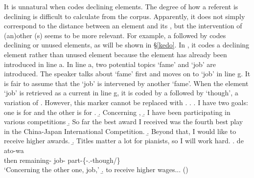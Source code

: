 It is unnatural when  codes declining elements.
The degree of how a referent is declining is difficult to calculate from the corpus.
Apparently, it does not simply correspond to the distance between an element and its ,
but the intervention of (an)other (s) seems to be more relevant.
For example,
a  followed by  codes declining or unused elements, as will be shown in \S \ref{kedo}.
In \Next[g],
it codes a declining element rather than unused element
because the element has already been introduced in line a.
In line a, two potential topics `fame' and `job' are introduced.
The speaker talks about `fame' first and moves on to `job' in line g.
It is fair to assume that the  `job' is intervened by another  `fame'.
When the element `job' is retrieved as a current  in line g,
it is coded by a  followed by  `though',
a variation of .
However,
this marker cannot be replaced with .
%
\ex.\label{sigoto}
 \a. I have two goals: one is for  and the other is for .
 \b. Concerning ,
 \b. I have been participating in various  competitions
 \b. So far the best award I received was the fourth best play in the China-Japan International Competition.
 \b. Beyond that, I would like to receive higher awards.
 \b. Titles matter a lot for pianists, so I will work hard.
 \bg. de ato-wa   \\
 	then remaining- job- part-\{-.-though/\} \\
	`Concerning the other one, job,'
 \b. to receive higher wages...
\hfill{()}
%





